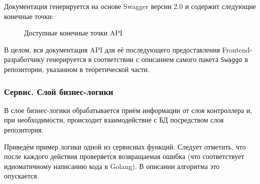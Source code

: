 \documentclass[diploma]{SCWorks}
\begin{document}
Документация генерируется на основе Swagger версии 2.0 и содержит следующие 
конечные точки:

\begin{figure}[H]
	\caption{Доступные конечные точки API}
	\label{pic:doc_endpoints}
\end{figure}

В целом, вся документация API для её последующего предоставления 
Frontend-разработчику генерируется в соответствии с описанием самого пакета
\texttt{Swaggo} в репозитории, указанном в теоретической части.

\subsubsection{Сервис. Слой бизнес-логики}

В слое бизнес-логики обрабатывается приём информации от слоя контроллера и, при
необходимости, происходит взаимодействие с БД посредством слоя репозитория.

Приведём пример логики одной из сервисных функций. Следует отметить, что после 
каждого действия проверяется возвращаемая ошибка (что соответствует 
идиоматичному написанию кода в Golang). В описании алгоритма это опускается. 
\end{document}
